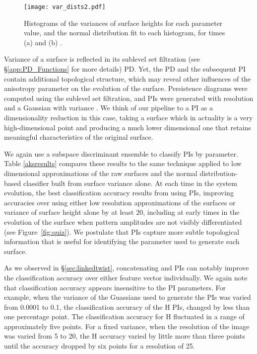 \documentclass[11pt]{article}
\begin{document}
\begin{figure}[h!]
\begin{centering}
\texttt{[image: var\_dists2.pdf]}
\caption{Histograms of the variances of surface heights for each parameter value, and the normal distribution fit to each histogram, for times (a)  and (b) .}
\label{fig:variance_dist}
\end{centering}
\end{figure}



Variance of a surface is reflected in its sublevel set filtration (see \S\ref{app:PD_Functions} for more details) PD.  Yet, the PD and the subsequent PI contain additional topological structure, which may reveal other influences of the anisotropy parameter on the evolution of the surface.  Persistence diagrams were computed using the sublevel set filtration, and PIs were generated with resolution   and a Gaussian with variance .  We think of our pipeline to a PI as a dimensionality reduction in this case, taking a surface which in actuality is a very high-dimensional point and producing a much lower dimensional one that retains meaningful characteristics of the original surface.  

We again use a subspace discriminant ensemble to classify PIs by parameter.  Table \ref{aksresults} compares these results to the same technique applied to low dimensional approximations of the raw surfaces and the normal distribution-based classifier built from surface variance alone.  At each time in the system evolution, the best classification accuracy results from using PIs, improving accuracies over using either low resolution approximations of the surfaces or variance of surface height alone by at least 20, including at early times in the evolution of the surface when pattern amplitudes are not visibly differentiated (see Figure~\ref{fig:quiz}).  We postulate that PIs capture more subtle topological information that is useful for identifying the parameter used to generate each surface. 

As we observed in \S\ref{sec:linkedtwist}, concatenating  and  PIs can notably improve the classification accuracy over either feature vector individually.  We again note that classification accuracy appears insensitive to the PI parameters.  For  example, when the variance of the Guassians used to generate the PIs was varied from 0.0001 to 0.1, the classification accuracy of the H PIs, changed by less than one percentage point. The classification accuracy for H fluctuated in a range of approximately five points. For a fixed variance, when the resolution of the image was varied from 5 to 20, the H accuracy varied by little more than three points until the accuracy dropped by six points for a resolution of 25. 
\end{document}
